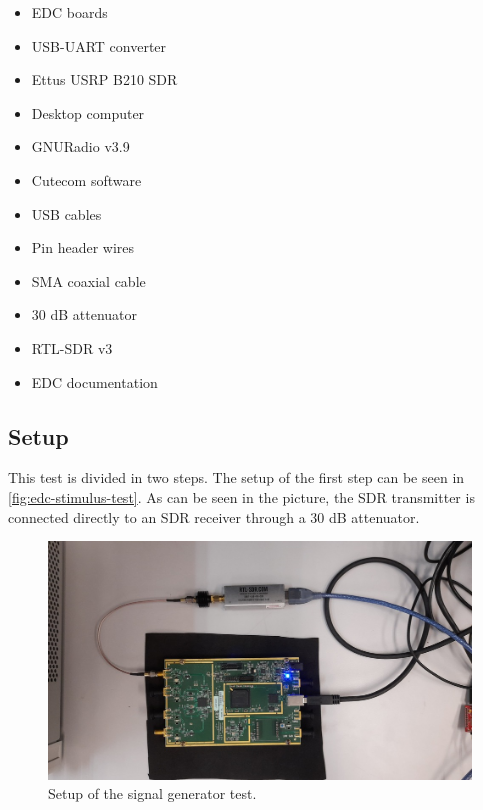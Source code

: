 \begin{itemize}
    \item EDC boards
    \item USB-UART converter
    \item Ettus USRP B210 SDR
    \item Desktop computer
    \item GNURadio v3.9
    \item Cutecom software
    \item USB cables
    \item Pin header wires
    \item SMA coaxial cable
    \item 30 dB attenuator
    \item RTL-SDR v3
    \item EDC documentation
\end{itemize}

\subsection{Setup}

This test is divided in two steps. The setup of the first step can be seen in \autoref{fig:edc-stimulus-test}. As can be seen in the picture, the SDR transmitter is connected directly to an SDR receiver through a 30 dB attenuator.

\begin{figure}[!ht]
    \begin{center}
        \includegraphics[width=\textwidth]{figures/edc_report/edc-stimulus-test}
        \caption{Setup of the signal generator test.}
        \label{fig:edc-stimulus-test}
    \end{center}
\end{figure}

